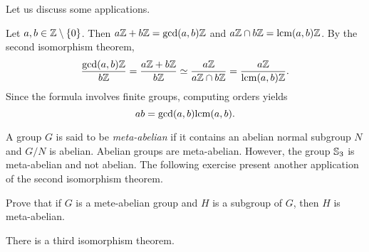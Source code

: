 Let us discuss some applications. 

\begin{example}
Let $a,b\in\mathbb{Z}\setminus\{0\}$. Then $a\mathbb{Z}+b\mathbb{Z}=\gcd(a,b)\mathbb{Z}$ and $a\mathbb{Z}\cap b\mathbb{Z}=\mathrm{lcm}(a,b)\mathbb{Z}$. By the second isomorphism theorem,
\[
\frac{\gcd(a,b)\mathbb{Z}}{b\mathbb{Z}}=\frac{a\mathbb{Z}+b\mathbb{Z}}{b\mathbb{Z}}\simeq
\frac{a\mathbb{Z}}{a\mathbb{Z}\cap b\mathbb{Z}}=\frac{a\mathbb{Z}}{\mathrm{lcm}(a,b)\mathbb{Z}}.
\]
Since the formula involves finite groups, 
computing orders yields 
\[
ab=\gcd(a,b)\mathrm{lcm}(a,b).
\]
\end{example}


A group $G$ is said to be \emph{meta-abelian}
if it contains an abelian normal subgroup $N$ and $G/N$
is abelian. Abelian groups are meta-abelian. However, the group $\mathbb{S}_3$ is meta-abelian and not abelian.  The following exercise
present another application of the second isomorphism theorem. 

\begin{exercise}
Prove that if $G$ is a mete-abelian group and $H$ is a subgroup of
$G$, then $H$ is meta-abelian. 
\end{exercise}


There is a third isomorphism theorem. 


